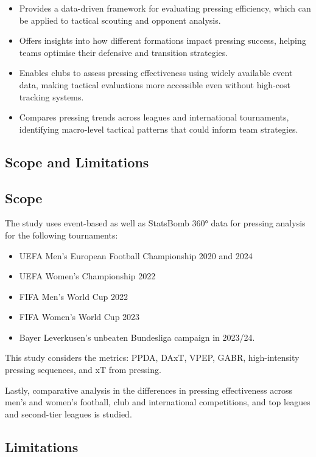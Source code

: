 \begin{itemize}
    \item Provides a data-driven framework for evaluating pressing efficiency, which can be applied to tactical scouting and opponent analysis.
    \item Offers insights into how different formations impact pressing success, helping teams optimise their defensive and transition strategies.
    \item Enables clubs to assess pressing effectiveness using widely available event data, making tactical evaluations more accessible even without high-cost tracking systems.
    \item Compares pressing trends across leagues and international tournaments, identifying macro-level tactical patterns that could inform team strategies.
\end{itemize}

\subsection{Scope and Limitations}

\subsection{Scope}

The study uses event-based as well as StatsBomb 360° data for pressing analysis for the following tournaments:
\begin{itemize}
    \item UEFA Men's European Football Championship 2020 and 2024
    \item UEFA Women's Championship 2022
    \item FIFA Men's World Cup 2022
    \item FIFA Women's World Cup 2023
    \item Bayer Leverkusen's unbeaten Bundesliga campaign in 2023/24.
\end{itemize}

This study considers the metrics: PPDA, DAxT, VPEP, GABR, high-intensity pressing sequences, and xT from pressing.

Lastly, comparative analysis in the differences in pressing effectiveness across men's and women's football, club and international competitions, and top leagues and second-tier leagues is studied.

\subsection{Limitations}

